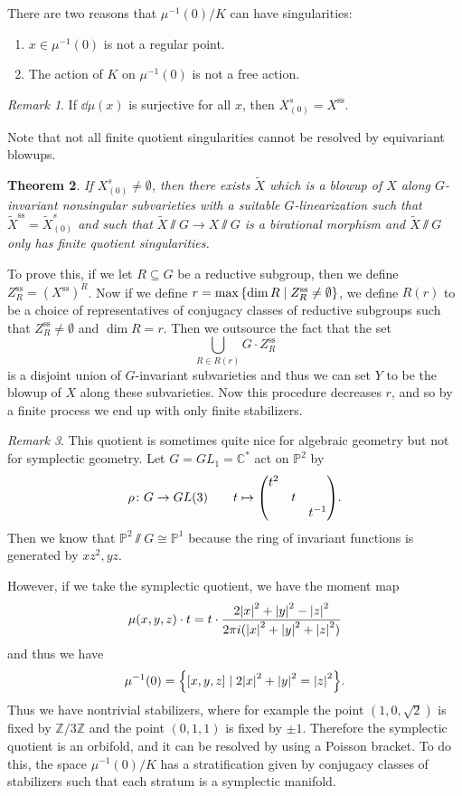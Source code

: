 \documentclass[leqno, openany]{memoir}
\newtheorem{thm}{Theorem}[section]
\theoremstyle{definition}
\theoremstyle{remark}
\newtheorem{rmk}[thm]{Remark}
\theoremstyle{plain}
\theoremstyle{definition}
\theoremstyle{remark}
\newcommand{\C}{\mathbb{C}}
\newcommand{\Z}{\mathbb{Z}}
\renewcommand{\P}{\mathbb{P}}
\newcommand{\mr}[1]{\mathrm{#1}}
\newcommand{\wt}[1]{\widetilde{#1}}
\begin{document}
There are two reasons that $\mu^{-1}(0)/K$ can have singularities:
\begin{enumerate} \item $x \in \mu^{-1}(0)$ is not a regular point.  \item The
action of $K$ on $\mu^{-1}(0)$ is not a free action.  \end{enumerate}

\begin{rmk} If $\dd{\mu}(x)$ is surjective for all $x$, then $X_{(0)}^s =
X^{\mr{ss}}$.  \end{rmk}

Note that not all finite quotient singularities cannot be resolved by
equivariant blowups.

\begin{thm} If $X_{(0)}^s \neq \emptyset$, then there exists $\wt{X}$ which is
    a blowup of $X$ along $G$-invariant nonsingular subvarieties with a
    suitable $G$-linearization such that $\wt{X}^{\mr{ss}} = \wt{X}_{(0)}^s$
    and such that $\wt{X} \sslash G \to X \sslash G$ is a birational morphism
    and $\wt{X} \sslash G$ only has finite quotient singularities.  \end{thm}

To prove this, if we let $R \subseteq G$ be a reductive subgroup, then we
define $Z_R^{\mr{ss}} = (X^{\mr{ss}})^R$. Now if we define $r = \max \qty{ \dim
R \mid Z_R^{\mr{ss}} \neq \emptyset }$, we define $R(r)$ to be a choice of
representatives of conjugacy classes of reductive subgroups such that
$Z_R^{\mr{ss}} \neq \emptyset$ and $\dim R = r$. Then we outsource the fact
that the set \[ \bigcup_{R \in R(r)} G \cdot Z_R^{\mr{ss}} \] is a disjoint
union of $G$-invariant subvarieties and thus we can set $Y$ to be the blowup of
$X$ along these subvarieties. Now this procedure decreases $r$, and so by a
finite process we end up with only finite stabilizers.

\begin{rmk} This quotient is sometimes quite nice for algebraic geometry but
    not for symplectic geometry. Let $G = GL_1 = \C^*$ act on $\P^2$ by \[ \rho
    \colon G \to GL(3) \qquad t \mapsto \mqty(\dmat{t^2, t, t^{-1}}). \] Then
    we know that $\P^2 \sslash G \cong \P^1$ because the ring of invariant
    functions is generated by $xz^2, yz$.

    However, if we take the symplectic quotient, we have the moment map \[
        \mu(x,y,z) \cdot t = t \cdot \frac{2 \abs{x}^2 + \abs{y}^2 -
        \abs{z}^2}{2 \pi i (\abs{x}^2 + \abs{y}^2 + \abs{z}^2)} \] and thus we
        have \[ \mu^{-1}(0) = \qty{ [x,y,z] \mid 2 \abs{x}^2 + \abs{y}^2 =
        \abs{z}^2 }. \] Thus we have nontrivial stabilizers, where for example
        the point $(1, 0, \sqrt{2})$ is fixed by $\Z/3\Z$ and the point
        $(0,1,1)$ is fixed by $\pm 1$. Therefore the symplectic quotient is an
        orbifold, and it can be resolved by using a Poisson bracket. To do
        this, the space $\mu^{-1}(0)/K$ has a stratification given by conjugacy
        classes of stabilizers such that each stratum is a symplectic manifold.
    \end{rmk}
\end{document}
